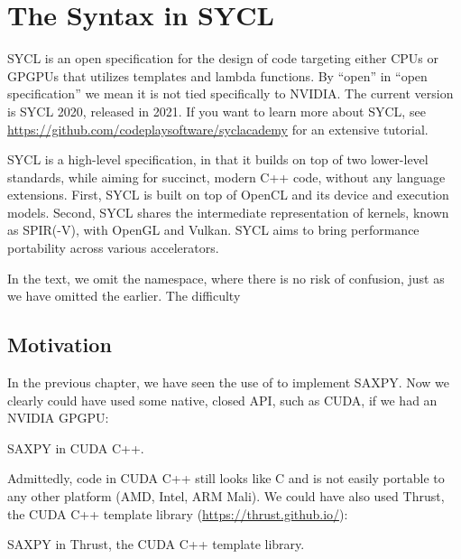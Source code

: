 \chapter{The Syntax in SYCL}

SYCL is an open specification for the design of code targeting either CPUs or GPGPUs 
that utilizes templates and lambda functions.
By ``open'' in ``open specification'' we mean it is not tied specifically to NVIDIA. 
The current version is SYCL 2020, released in 2021. 
If you want to learn more about SYCL, see 
\url{https://github.com/codeplaysoftware/syclacademy} for an extensive tutorial.

SYCL is a high-level specification, in that it builds on top of two lower-level standards, while aiming for succinct, modern C++ code, without any language extensions. First, SYCL is built on top of OpenCL and its device and execution models. Second, SYCL shares the intermediate representation of kernels, known as SPIR(-V), with OpenGL and Vulkan. 
SYCL aims to bring performance portability across various accelerators. 

In the text, we omit the  namespace, where there is no risk of confusion, just as we have omitted the  earlier. The difficulty 

\section{Motivation}

In the previous chapter, we have seen the use of  to implement SAXPY. Now we clearly could have used some native, closed API, such as CUDA, if we had an NVIDIA GPGPU:

\raggedbottom
\begin{codebox}[]{}
\footnotesize SAXPY in CUDA C++.
\tcblower
{}
\end{codebox}

Admittedly, code in CUDA C++ still looks like C and is not easily portable to any other platform (AMD, Intel, ARM Mali). We could have also used Thrust, the CUDA C++ template library (\url{https://thrust.github.io/}): 

\raggedbottom
\begin{codebox}[]{}
\footnotesize SAXPY in Thrust, the CUDA C++ template library.
\tcblower
{}
\end{codebox}


